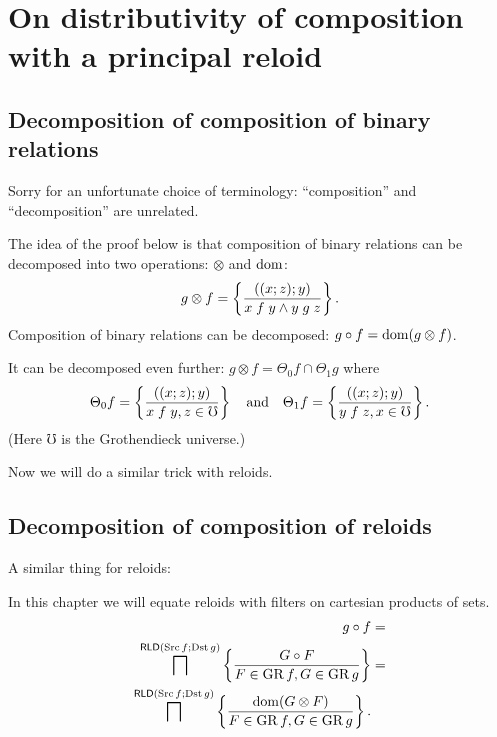 
\chapter{On distributivity of composition with a principal reloid}


\section{Decomposition of composition
of binary relations}
\begin{rem}
Sorry for an unfortunate choice of terminology: ``composition''
and ``decomposition'' are unrelated.
\end{rem}
The idea of the proof below is that composition of binary relations
can be decomposed into two operations: $\otimes$ and $\operatorname{dom}$:
\[
g\otimes f=\left\{ \frac{((x;z);y)}{x\mathrel fy\land y\mathrel gz}\right\}.
\]
Composition of binary relations can be decomposed: $g\circ f=\operatorname{dom}(g\otimes f)$.

It can be decomposed even further: $g\otimes f=\Theta_{0}f\cap\Theta_{1}g$
where
\[
\Theta_{0}f=\left\{ \frac{((x;z);y)}{x\mathrel fy,z\in\mho}\right\}\quad\text{and}\quad\Theta_{1}f=\left\{ \frac{((x;z);y)}{y\mathrel fz,x\in\mho}\right\}.
\]
(Here $\mho$ is the Grothendieck universe.)

Now we will do a similar trick with reloids.


\section{Decomposition of
composition of reloids}

A similar thing for reloids:

In this chapter we will equate reloids with filters on cartesian products
of sets. 
\begin{align*}
g\circ f & =\\
\bigsqcap^{\mathsf{RLD}(\operatorname{Src} f;\operatorname{Dst} g)}\left\{ \frac{G\circ F}{F\in\operatorname{GR} f,G\in\operatorname{GR} g}\right\} & =\\
\bigsqcap^{\mathsf{RLD}(\operatorname{Src} f;\operatorname{Dst} g)}\left\{ \frac{\operatorname{dom}(G\otimes F)}{F\in\operatorname{GR} f,G\in\operatorname{GR} g}\right\}.
\end{align*}

